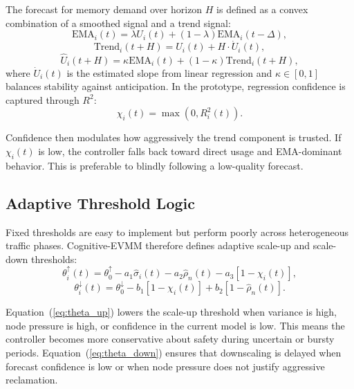 \documentclass[12pt,a4paper]{article}
\begin{document}
The forecast for memory demand over horizon $H$ is defined as a convex combination of a smoothed signal and a trend signal:
\begin{equation}
\label{eq:ema}
\text{EMA}_i(t) = \lambda U_i(t) + (1-\lambda)\text{EMA}_i(t-\Delta),
\end{equation}
\begin{equation}
\label{eq:trend}
\text{Trend}_i(t+H) = U_i(t) + H \cdot \dot{U}_i(t),
\end{equation}
\begin{equation}
\label{eq:hybrid}
\hat{U}_i(t+H) = \kappa \text{EMA}_i(t) + (1-\kappa)\text{Trend}_i(t+H),
\end{equation}
where $\dot{U}_i(t)$ is the estimated slope from linear regression and $\kappa \in [0,1]$ balances stability against anticipation. In the prototype, regression confidence is captured through $R^2$:
\begin{equation}
\label{eq:confidence}
\chi_i(t) = \max(0, R_i^2(t)).
\end{equation}

Confidence then modulates how aggressively the trend component is trusted. If $\chi_i(t)$ is low, the controller falls back toward direct usage and EMA-dominant behavior. This is preferable to blindly following a low-quality forecast.

\subsection{Adaptive Threshold Logic}

Fixed thresholds are easy to implement but perform poorly across heterogeneous traffic phases. Cognitive-EVMM therefore defines adaptive scale-up and scale-down thresholds:
\begin{equation}
\label{eq:theta_up}
\theta_i^{\uparrow}(t) = \theta_0^{\uparrow} - a_1 \hat{\sigma}_i(t) - a_2 \hat{\rho}_n(t) - a_3 [1-\chi_i(t)],
\end{equation}
\begin{equation}
\label{eq:theta_down}
\theta_i^{\downarrow}(t) = \theta_0^{\downarrow} - b_1 [1-\chi_i(t)] + b_2 [1-\hat{\rho}_n(t)].
\end{equation}

Equation~(\ref{eq:theta_up}) lowers the scale-up threshold when variance is high, node pressure is high, or confidence in the current model is low. This means the controller becomes more conservative about safety during uncertain or bursty periods. Equation~(\ref{eq:theta_down}) ensures that downscaling is delayed when forecast confidence is low or when node pressure does not justify aggressive reclamation.
\end{document}
